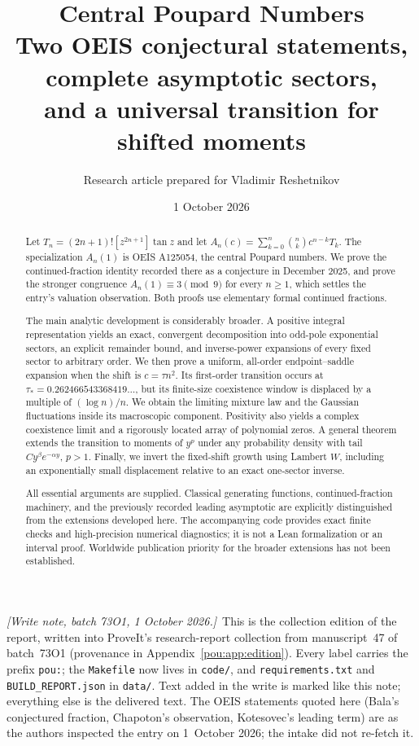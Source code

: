 \documentclass[11pt]{article}
\title{\textbf{Central Poupard Numbers}\\[0.35em]
\Large Two OEIS conjectural statements, complete asymptotic sectors,\\
and a universal transition for shifted moments}
\author{Research article prepared for Vladimir Reshetnikov}
\date{1 October 2026}
\theoremstyle{definition}
\theoremstyle{remark}
\newcommand{\writenote}[1]{\par\smallskip\noindent
 \textit{[Write note, batch 73O1, 1 October 2026.]}\ #1\par\smallskip}
\begin{document}
\maketitle
\begin{abstract}
Let $T_n=(2n+1)![z^{2n+1}]\tan z$ and let
$A_n(c)=\sum_{k=0}^n\binom nk c^{n-k}T_k$.
The specialization $A_n(1)$ is OEIS A125054, the central Poupard numbers.
We prove the continued-fraction identity recorded there as a conjecture in
December 2025, and prove the stronger congruence $A_n(1)\equiv3\pmod9$
for every $n\ge1$, which settles the entry's valuation observation.
Both proofs use elementary formal continued fractions.

The main analytic development is considerably broader.  A positive integral
representation yields an exact, convergent decomposition into odd-pole
exponential sectors, an explicit remainder bound, and inverse-power expansions
of every fixed sector to arbitrary order.  We then prove a uniform, all-order
endpoint--saddle expansion when the shift is $c=\tau n^2$.  Its first-order
transition occurs at $\tau_*=0.262466543368419\ldots$, but its finite-size
coexistence window is displaced by a multiple of $(\log n)/n$.
We obtain the limiting mixture law and the Gaussian fluctuations inside its
macroscopic component.  Positivity also yields a complex coexistence limit
and a rigorously located array of polynomial zeros.  A general theorem
extends the transition to moments
of $y^p$ under any probability density with tail $Cy^\beta e^{-\alpha y}$,
$p>1$.  Finally, we invert the fixed-shift growth using Lambert $W$, including
an exponentially small displacement relative to an exact one-sector inverse.

All essential arguments are supplied.  Classical generating functions,
continued-fraction machinery, and the previously recorded leading asymptotic
are explicitly distinguished from the extensions developed here.
The accompanying code provides exact finite checks and high-precision
numerical diagnostics; it is not a Lean formalization or an interval proof.
Worldwide publication priority for the broader extensions has not been
established.
\end{abstract}

\writenote{This is the collection edition of the report, written into
ProveIt's research-report collection from manuscript~47 of batch~73O1
(provenance in Appendix~\ref{pou:app:edition}). Every label carries the
prefix \texttt{pou:}; the \texttt{Makefile} now lives in \texttt{code/},
and \texttt{requirements.txt} and \texttt{BUILD\_REPORT.json} in
\texttt{data/}. Text added in the write is marked like this note;
everything else is the delivered text. The OEIS statements quoted here
(Bala's conjectured fraction, Chapoton's observation, Kotesovec's
leading term) are as the authors inspected the entry on 1~October 2026;
the intake did not re-fetch it.}
\end{document}
